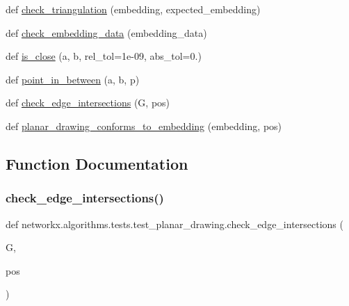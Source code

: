 \begin{DoxyCompactItemize}
\item 
def \hyperlink{namespacenetworkx_1_1algorithms_1_1tests_1_1test__planar__drawing_afc1e6d21df7dab1c1bed57587f11d725}{check\+\_\+triangulation} (embedding, expected\+\_\+embedding)
\item 
def \hyperlink{namespacenetworkx_1_1algorithms_1_1tests_1_1test__planar__drawing_a79f77a657e4b0f784cb63742c17b23e5}{check\+\_\+embedding\+\_\+data} (embedding\+\_\+data)
\item 
def \hyperlink{namespacenetworkx_1_1algorithms_1_1tests_1_1test__planar__drawing_a8cd696955724d73f73ab494c8b2b61f6}{is\+\_\+close} (a, b, rel\+\_\+tol=1e-\/09, abs\+\_\+tol=0.)
\item 
def \hyperlink{namespacenetworkx_1_1algorithms_1_1tests_1_1test__planar__drawing_a9de9ff15bea5ed9e0aa7b7966ddaad04}{point\+\_\+in\+\_\+between} (a, b, p)
\item 
def \hyperlink{namespacenetworkx_1_1algorithms_1_1tests_1_1test__planar__drawing_a3d9728bd47c99ca1eb0a4d02929033d8}{check\+\_\+edge\+\_\+intersections} (G, pos)
\item 
def \hyperlink{namespacenetworkx_1_1algorithms_1_1tests_1_1test__planar__drawing_ae6e695dd6ef065c453569b782a0bbd73}{planar\+\_\+drawing\+\_\+conforms\+\_\+to\+\_\+embedding} (embedding, pos)
\end{DoxyCompactItemize}


\subsection{Function Documentation}
\mbox{\label{namespacenetworkx_1_1algorithms_1_1tests_1_1test__planar__drawing_a3d9728bd47c99ca1eb0a4d02929033d8}} 
\subsubsection{\texorpdfstring{check\+\_\+edge\+\_\+intersections()}{check\_edge\_intersections()}}
{\footnotesize\ttfamily def networkx.\+algorithms.\+tests.\+test\+\_\+planar\+\_\+drawing.\+check\+\_\+edge\+\_\+intersections (\begin{DoxyParamCaption}\item[{}]{G,  }\item[{}]{pos }\end{DoxyParamCaption})}

